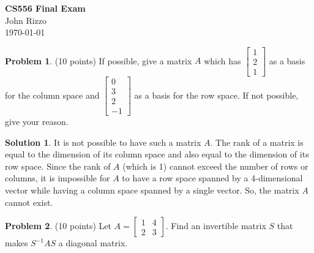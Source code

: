 \documentclass[11pt]{article}
\theoremstyle{definition}
\newtheorem{problem}{Problem}
\newtheorem*{solution}{Solution}
\begin{document}
\begin{center}
    {\LARGE \textbf{CS556 Final Exam}} \\[0.5em]
    {\large John Rizzo} \\[0.3em]
    {\large \today}
\end{center}

\vspace{1em}


\begin{problem}
(10 points) If possible, give a matrix $A$ which has $\begin{bmatrix}
    1 \\ 2 \\ 1
\end{bmatrix}$ as a basis for the column space and $\begin{bmatrix}
    0 \\ 3 \\ 2 \\ -1
\end{bmatrix}$ as a basis for the row space. If not possible, give your reason.
\end{problem}

\begin{solution}
    It is not possible to have such a matrix $A$. The rank of a matrix is equal to the dimension of its column space and also equal to the dimension of its row space. 
    Since the rank of $A$ (which is 1) cannot exceed the number of rows or columns, it is impossible for $A$ to have a row space spanned by a 4-dimensional vector while having a column space spanned by a single vector. So, the matrix $A$ cannot exist.
\end{solution}


\begin{problem}
(10 points) Let $A = \begin{bmatrix}
    1 & 4 \\
    2 & 3
\end{bmatrix}$. Find an invertible matrix $S$ that makes $S^{-1}AS$ a diagonal matrix.
\end{problem}
\end{document}
